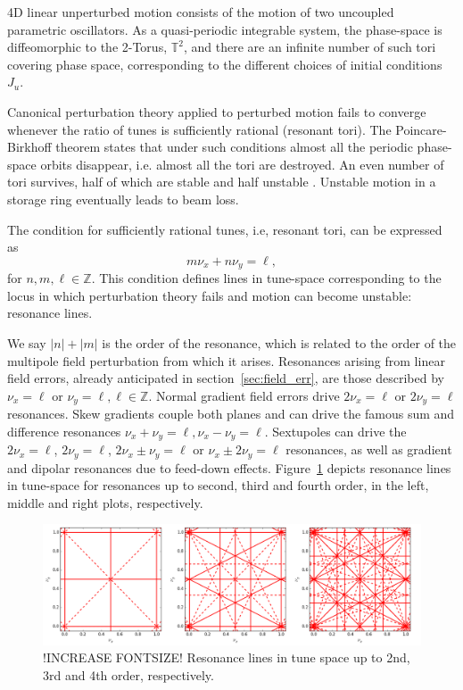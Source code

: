 4D linear unperturbed motion consists of the motion of two uncoupled parametric oscillators. As a quasi-periodic integrable system, the phase-space is diffeomorphic to the 2-Torus, $\mathbb{T}^2$, and there are an infinite number of such tori covering phase space, corresponding to the different choices of initial conditions $J_u$.

Canonical perturbation theory applied to perturbed motion fails to converge whenever the ratio of tunes is sufficiently rational (resonant tori). The Poincare-Birkhoff theorem states that under such conditions almost all the periodic phase-space orbits disappear, i.e. almost all the tori are destroyed. An even number of tori survives, half of which are stable and half unstable \cite[section 10.2]{marcus_mecanica2023}. Unstable motion in a storage ring eventually leads to beam loss.

The condition for sufficiently rational tunes, i.e, resonant tori, can be expressed as
\begin{equation}
        m\nu_x + n\nu_y = \ell,
        \label{eq:resonance_condition}
\end{equation}
    for $n, m, \ell\in\mathbb{Z}$. This condition defines lines in tune-space corresponding to the locus in which perturbation theory fails and motion can become unstable: resonance lines.

    We say $|n|+|m|$ is the order of the resonance, which is related to the order of the multipole field perturbation from which it arises.
    Resonances arising from linear field errors, already anticipated in section~\ref{sec:field_err}, are those described by $\nu_x=\ell$ or $\nu_y =\ell, \ell\in\mathbb{Z}$. Normal gradient field errors drive $2\nu_x=\ell$ or $2\nu_y =\ell$ resonances. Skew gradients couple both planes and can drive the famous sum and difference resonances $\nu_x + \nu_y = \ell, \nu_x - \nu_y = \ell$. Sextupoles can drive the $2\nu_x=\ell$, $2\nu_y =\ell$, $2\nu_x\pm\nu_y = \ell$ or $\nu_x\pm 2\nu_y=\ell$ resonances, as well as gradient and dipolar resonances due to feed-down effects. Figure~\ref{resons} depicts resonance lines in tune-space for resonances up to second, third and fourth order, in the left, middle and right plots, respectively.
\begin{figure}[thb]
    \centering
    \includegraphics[width=\textwidth]{Images/tunes.png}
    \caption[Resonance lines in tune space up to 2nd, 3rd and 4th order.]{!INCREASE FONTSIZE! Resonance lines in tune space up to 2nd, 3rd and 4th order, respectively.}
    \label{resons}
\end{figure}

